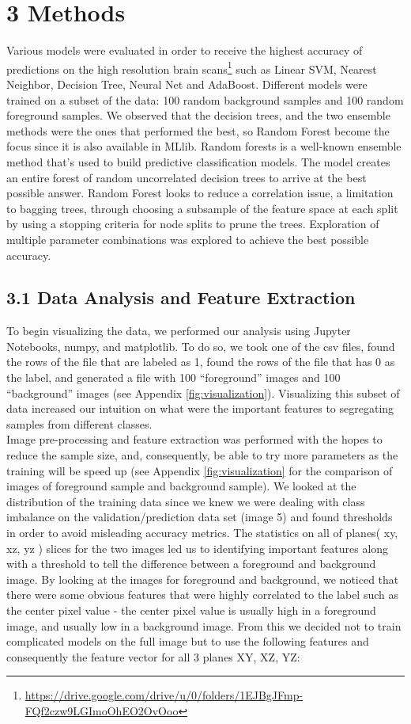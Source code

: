 \documentclass{neu_handout}
\begin{document}
\section*{3 Methods}
Various models were evaluated in order to receive the highest accuracy of predictions on the high resolution brain scans\footnote{\url{https://drive.google.com/drive/u/0/folders/1EJBgJFmp-FQf2czw9LGImoOhEO2OvOoo}} such as Linear SVM, Nearest Neighbor, Decision Tree, Neural Net and AdaBoost. Different models were trained on a subset of the data: 100 random background samples and 100 random foreground samples. We observed that the decision trees, and the two ensemble methods were the ones that performed the best, so Random Forest become the focus since it is also available in MLlib. Random forests is a well-known ensemble method that's used to build predictive classification models. The model creates an entire forest of random uncorrelated decision trees to arrive at the best possible answer. Random Forest looks to reduce a correlation issue, a limitation to bagging trees, through choosing a subsample of the feature space at each split by using a stopping criteria for node splits to prune the trees. Exploration of multiple parameter combinations was explored to achieve the best possible accuracy. \\

\subsection*{3.1 Data Analysis and Feature Extraction}
To begin visualizing the data, we performed our analysis using Jupyter Notebooks, numpy, and matplotlib. To do so, we took one of the csv files, found the rows of the file that are labeled as 1, found the rows of the file that has 0 as the label, and generated a file with 100 ``foreground'' images and 100 ``background'' images (see Appendix \ref{fig:visualization}). Visualizing this subset of data increased our intuition on what were the important features to segregating samples from different classes.\\

Image pre-processing and feature extraction was performed with the hopes to reduce the sample size, and, consequently, be able to try more parameters as the training will be speed up (see Appendix \ref{fig:visualization} for the comparison of images of foreground sample and background sample). We looked at the distribution of the training data since we knew we were dealing with class imbalance on the validation/prediction data set (image 5) and found thresholds in order to avoid misleading accuracy metrics. The statistics on all of planes( xy, xz, yz ) slices for the two images led us to identifying important features along with a threshold to tell the difference between a foreground and background image. By looking at the images for foreground and background, we noticed that there were some obvious features that were highly correlated to the label such as the center pixel value - the center pixel value is usually high in a foreground image, and usually low in a background image. From this we decided not to train complicated models on the full image but to use the following features and consequently the feature vector for all 3 planes XY, XZ, YZ:
\end{document}

